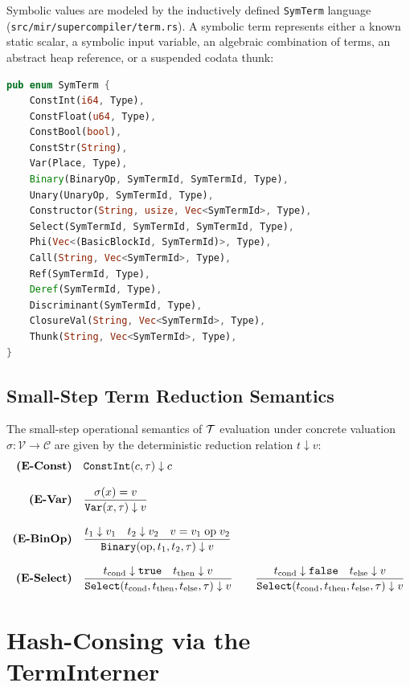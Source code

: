 Symbolic values are modeled by the inductively defined \texttt{SymTerm} language (\texttt{src/mir/supercompiler/term.rs}). A symbolic term represents either a known static scalar, a symbolic input variable, an algebraic combination of terms, an abstract heap reference, or a suspended codata thunk:

\begin{lstlisting}[language=Rust, caption={The SymTerm algebraic datatype.}]
pub enum SymTerm {
    ConstInt(i64, Type),
    ConstFloat(u64, Type),
    ConstBool(bool),
    ConstStr(String),
    Var(Place, Type),
    Binary(BinaryOp, SymTermId, SymTermId, Type),
    Unary(UnaryOp, SymTermId, Type),
    Constructor(String, usize, Vec<SymTermId>, Type),
    Select(SymTermId, SymTermId, SymTermId, Type),
    Phi(Vec<(BasicBlockId, SymTermId)>, Type),
    Call(String, Vec<SymTermId>, Type),
    Ref(SymTermId, Type),
    Deref(SymTermId, Type),
    Discriminant(SymTermId, Type),
    ClosureVal(String, Vec<SymTermId>, Type),
    Thunk(String, Vec<SymTermId>, Type),
}
\end{lstlisting}

\subsection{Small-Step Term Reduction Semantics}
The small-step operational semantics of $\mathcal{T}$ evaluation under concrete valuation $\sigma : \mathcal{V} \to \mathcal{C}$ are given by the deterministic reduction relation $t \downarrow v$:
\begin{align}
\text{\bf (E-Const)} \quad & \mathtt{ConstInt}(c, \tau) \downarrow c \\[0.8em]
\text{\bf (E-Var)} \quad & \frac{\sigma(x) = v}{\mathtt{Var}(x, \tau) \downarrow v} \\[0.8em]
\text{\bf (E-BinOp)} \quad & \frac{t_1 \downarrow v_1 \quad t_2 \downarrow v_2 \quad v = v_1 \;\text{op}\; v_2}{\mathtt{Binary}(\text{op}, t_1, t_2, \tau) \downarrow v} \\[0.8em]
\text{\bf (E-Select)} \quad & \frac{t_{\text{cond}} \downarrow \mathtt{true} \quad t_{\text{then}} \downarrow v}{\mathtt{Select}(t_{\text{cond}}, t_{\text{then}}, t_{\text{else}}, \tau) \downarrow v} \qquad
\frac{t_{\text{cond}} \downarrow \mathtt{false} \quad t_{\text{else}} \downarrow v}{\mathtt{Select}(t_{\text{cond}}, t_{\text{then}}, t_{\text{else}}, \tau) \downarrow v}
\end{align}

\section{Hash-Consing via the TermInterner}
\label{sec:symbolic_state:interner}

